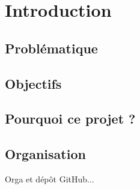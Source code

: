 \chapter{Introduction}
\label{ch:intro}

\section{Problématique}

\section{Objectifs}

\section{Pourquoi ce projet ?}

\section{Organisation}

Orga et dépôt GitHub...
